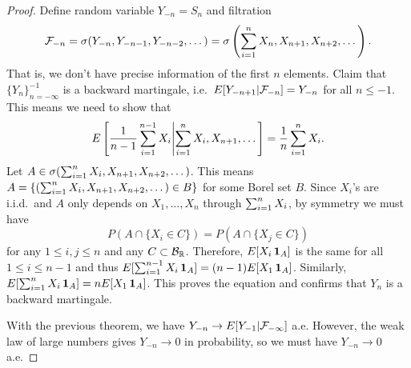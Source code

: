 \documentclass[a4paper]{article}
\begin{document}
\begin{proof}
  Define random variable $Y_{-n} = S_n$ and filtration 
  \[
  \mathcal{F}_{-n} = \sigma(Y_{-n}, Y_{-n-1}, Y_{-n-2}, \dots) = 
  \sigma \left( \sum_{i=1}^n X_n, X_{n + 1}, X_{n + 2}, \dots \right).
  \]
  That is, we don't have precise information of the first $n$
  elements. Claim that 
  $\{ Y_n \}_{n = -\infty}^{-1}$ is a backward martingale, i.e.\ 
  $E [ Y_{- n + 1} | \mathcal{F}_{-n} ] = Y_{-n}$ for all $n \leq -1$. 
  This means we need to show that 
  \begin{align*}
    E \left[ \frac{1}{n - 1} \sum_{i=1}^{n - 1} X_i 
    \middle| \sum_{i=1}^n X_i, X_{n + 1}, \dots \right] = \frac{1}{n} \sum_{i=1}^n X_i.
  \end{align*}
  Let $A \in \sigma (\sum_{i=1}^n X_i, X_{n + 1}, X_{n + 2}, \dots)$. 
  This means $A = \{ (\sum_{i=1}^n X_i, X_{n + 1}, X_{n + 2}, \dots)
  \in B \}$ for some Borel set $B$. Since $X_i$'s are i.i.d.\
  and $A$ only depends on $X_1, \dots, X_n$ through
  $\sum_{i=1}^n X_i$, by symmetry we must have
  \[
  P (A \cap \{ X_i \in C \}) = P(A \cap \{ X_j \in C \})
  \]
  for any $1 \leq i,j \leq n$ and any $C \subset \mathcal{B}_{\mathbb{R}}$.
  Therefore, $E [X_i \operatorname{\mathbf{1}}_A]$ is the same for all $1 \leq i \leq n - 1$
  and thus $E [\sum_{i=1}^{n-1} X_i \operatorname{\mathbf{1}}_A] = (n - 1) E [X_1 \operatorname{\mathbf{1}}_A]$. Similarly,
  $E [\sum_{i=1}^n X_i \operatorname{\mathbf{1}}_A] = n E[X_1 \operatorname{\mathbf{1}}_A]$. This proves the equation 
  and confirms that $Y_n$ is a backward martingale.
  
  With the previous theorem, we have $Y_{-n} \to E[Y_{-1} | \mathcal{F}_{-\infty}]$
  a.e. However, the weak law of large numbers gives $Y_{-n} \to 0$ 
  in probability, so we must have $Y_{-n} \to 0$ a.e.

\end{proof}
\end{document}
